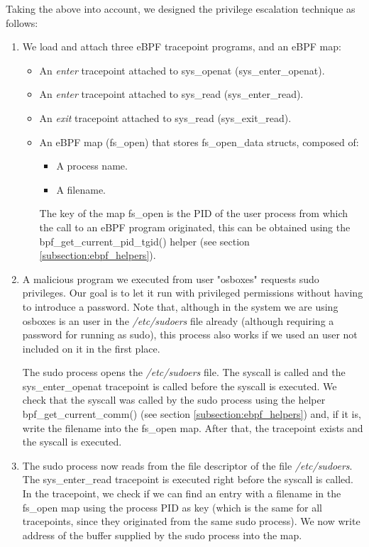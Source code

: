 Taking the above into account, we designed the privilege escalation technique as follows:
\begin{enumerate}
\item We load and attach three eBPF tracepoint programs, and an eBPF map:
\begin{itemize}
	\item An \textit{enter} tracepoint attached to sys\_openat (sys\_enter\_openat).
	\item An \textit{enter} tracepoint attached to sys\_read (sys\_enter\_read).
	\item An \textit{exit} tracepoint attached to sys\_read (sys\_exit\_read).
	\item An eBPF map (fs\_open) that stores fs\_open\_data structs, composed of:
	\begin{itemize}
	\item A process name.
	\item A filename.
	\end{itemize}
	The key of the map fs\_open is the PID of the user process from which the call to an eBPF program originated, this can be obtained using the bpf\_get\_current\_pid\_tgid() helper (see section \ref{subsection:ebpf_helpers}).
\end{itemize}
\item A malicious program we executed from user "osboxes" requests sudo privileges. Our goal is to let it run with privileged permissions without having to introduce a password. Note that, although in the system we are using osboxes is an user in the \textit{/etc/sudoers} file already (although requiring a password for running as sudo), this process also works if we used an user not included on it in the first place.

The sudo process opens the \textit{/etc/sudoers} file. The syscall is called and the sys\_enter\_openat tracepoint is called before the syscall is executed. We check that the syscall was called by the sudo process using the helper bpf\_get\_current\_comm() (see section \ref{subsection:ebpf_helpers}) and, if it is, write the filename into the fs\_open map. After that, the tracepoint exists and the syscall is executed.

\item The sudo process now reads from the file descriptor of the file \textit{/etc/sudoers}. The sys\_enter\_read tracepoint is executed right before the syscall is called. In the tracepoint, we check if we can find an entry with a filename in the fs\_open map using the process PID as key (which is the same for all tracepoints, since they originated from the same sudo process). We now write address of the buffer supplied by the sudo process into the map.


\end{enumerate}
